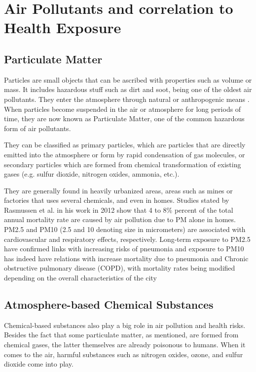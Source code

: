 ﻿\documentclass[10pt,11pt,12pt,oneside]{book}
\begin{document}
    \section{Air Pollutants and correlation to Health Exposure}
        \subsection{Particulate Matter}
        Particles are small objects that can be ascribed with properties such as volume or mass. It includes hazardous stuff such as dirt and soot, being one of the oldest air pollutants. They enter the atmosphere through natural or anthropogenic means \cite{knudsen2012particulate}. When particles become suspended in the air or atmosphere for long periods of time, they are now known as Particulate Matter, one of the common hazardous form of air pollutants.

        They can be classified as primary particles, which are particles that are directly emitted into the atmosphere or form by rapid condensation of gas molecules, or secondary particles which are formed from chemical transformation of existing gases (e.g. sulfur dioxide, nitrogen oxides, ammonia, etc.). \cite{finlayson2000chemistry}

        They are generally found in heavily urbanized areas, areas such as mines or factories that uses several chemicals, and even in homes. Studies stated by Rasmussen et al. in his work in 2012 show that 4 to 8\% percent of the total annual mortality rate are caused by air pollution due to PM alone in homes. PM2.5 and PM10 (2.5 and 10 denoting size in micrometers) are associated with cardiovascular and respiratory effects, respectively. Long-term exposure to PM2.5 have confirmed links with increasing risks of pneumonia \cite{Neupane2010} and exposure to PM10 has indeed have relations with increase mortality due to pneumonia and Chronic obstructive pulmonary disease (COPD), with mortality rates being modified depending on the overall characteristics of the city \cite{MedinaRamn2006}
        \subsection{Atmosphere-based Chemical Substances}
        Chemical-based substances also play a big role in air pollution and health risks. Besides the fact that some particulate matter, as mentioned, are formed from chemical gases, the latter themselves are already poisonous to humans. When it comes to the air, harmful substances such as nitrogen oxides, ozone, and sulfur dioxide come into play.
\end{document}
